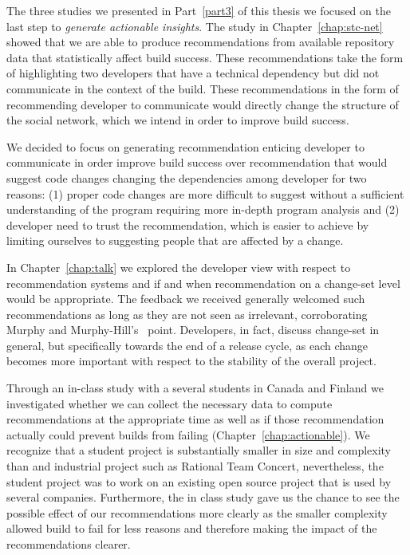 The three studies we presented in Part~\ref{part3} of this thesis we focused on the last step to \emph{generate actionable insights}.
The study in Chapter~\ref{chap:stc-net} showed that we are able to produce recommendations from available repository data that statistically affect build success.
These recommendations take the form of highlighting two developers that have a technical dependency but did not communicate in the context of the build.
These recommendations in the form of recommending developer to communicate would directly change the structure of the social network, which we intend in order to improve build success.

We decided to focus on generating recommendation enticing developer to communicate in order improve build success over recommendation that would suggest code changes changing the dependencies among developer for two reasons:
(1) proper code changes are more difficult to suggest without a sufficient understanding of the program requiring more in-depth program analysis and 
(2) developer need to trust the recommendation, which is easier to achieve by limiting ourselves to suggesting people that are affected by a change.

In Chapter~\ref{chap:talk} we explored the developer view with respect to recommendation systems and if and when recommendation on a change-set level would be appropriate.
The feedback we received generally welcomed such recommendations as long as they are not seen as irrelevant, corroborating Murphy and Murphy-Hill's~\cite{murphy:rsse:2010} point.
Developers, in fact, discuss change-set in general, but specifically towards the end of a release cycle, as each change becomes more important with respect to the stability of the overall project.

Through an in-class study with a several students in Canada and Finland we investigated whether we can collect the necessary data to compute recommendations at the appropriate time as well as if those recommendation actually could prevent builds from failing (Chapter~\ref{chap:actionable}).
We recognize that a student project is substantially smaller in size and complexity than and industrial project such as Rational Team Concert, nevertheless, the student project was to work on an existing open source project that is used by several companies.
Furthermore, the in class study gave us the chance to see the possible effect of our recommendations more clearly as the smaller complexity allowed build to fail for less reasons and therefore making the impact of the recommendations clearer.

